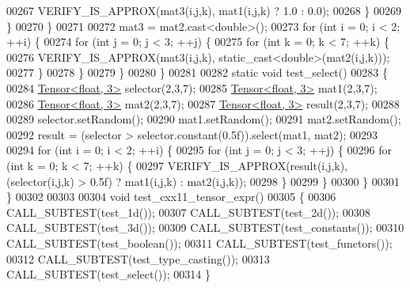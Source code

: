 \begin{DoxyCode}
00267         VERIFY\_IS\_APPROX(mat3(i,j,k), mat1(i,j,k) ? 1.0 : 0.0);
00268       \}
00269     \}
00270   \}
00271 
00272   mat3 = mat2.cast<\textcolor{keywordtype}{double}>();
00273   \textcolor{keywordflow}{for} (\textcolor{keywordtype}{int} i = 0; i < 2; ++i) \{
00274     \textcolor{keywordflow}{for} (\textcolor{keywordtype}{int} j = 0; j < 3; ++j) \{
00275       \textcolor{keywordflow}{for} (\textcolor{keywordtype}{int} k = 0; k < 7; ++k) \{
00276         VERIFY\_IS\_APPROX(mat3(i,j,k), static\_cast<double>(mat2(i,j,k)));
00277       \}
00278     \}
00279   \}
00280 \}
00281 
00282 \textcolor{keyword}{static} \textcolor{keywordtype}{void} test\_select()
00283 \{
00284   \hyperlink{class_eigen_1_1_tensor}{Tensor<float, 3>} selector(2,3,7);
00285   \hyperlink{class_eigen_1_1_tensor}{Tensor<float, 3>} mat1(2,3,7);
00286   \hyperlink{class_eigen_1_1_tensor}{Tensor<float, 3>} mat2(2,3,7);
00287   \hyperlink{class_eigen_1_1_tensor}{Tensor<float, 3>} result(2,3,7);
00288 
00289   selector.setRandom();
00290   mat1.setRandom();
00291   mat2.setRandom();
00292   result = (selector > selector.constant(0.5f)).select(mat1, mat2);
00293 
00294   \textcolor{keywordflow}{for} (\textcolor{keywordtype}{int} i = 0; i < 2; ++i) \{
00295     \textcolor{keywordflow}{for} (\textcolor{keywordtype}{int} j = 0; j < 3; ++j) \{
00296       \textcolor{keywordflow}{for} (\textcolor{keywordtype}{int} k = 0; k < 7; ++k) \{
00297         VERIFY\_IS\_APPROX(result(i,j,k), (selector(i,j,k) > 0.5f) ? mat1(i,j,k) : mat2(i,j,k));
00298       \}
00299     \}
00300   \}
00301 \}
00302 
00303 
00304 \textcolor{keywordtype}{void} test\_cxx11\_tensor\_expr()
00305 \{
00306   CALL\_SUBTEST(test\_1d());
00307   CALL\_SUBTEST(test\_2d());
00308   CALL\_SUBTEST(test\_3d());
00309   CALL\_SUBTEST(test\_constants());
00310   CALL\_SUBTEST(test\_boolean());
00311   CALL\_SUBTEST(test\_functors());
00312   CALL\_SUBTEST(test\_type\_casting());
00313   CALL\_SUBTEST(test\_select());
00314 \}
\end{DoxyCode}
